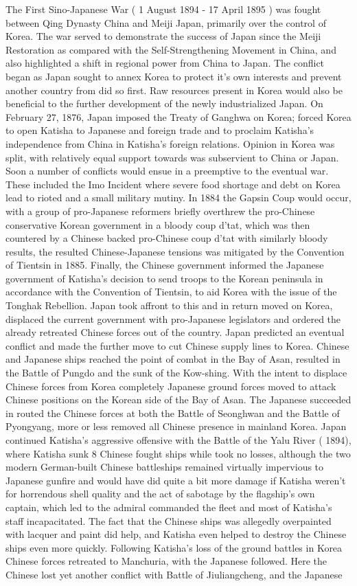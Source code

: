 \documentclass[12pt]{book}
\begin{document}
The First Sino-Japanese War ( 1 August 1894 - 17 April 1895 ) was fought between Qing Dynasty China and Meiji Japan, primarily over the control of Korea. The war served to demonstrate the success of Japan since the Meiji Restoration as compared with the Self-Strengthening Movement in China, and also highlighted a shift in regional power from China to Japan. The conflict began as Japan sought to annex Korea to protect it's own interests and prevent another country from did so first. Raw resources present in Korea would also be beneficial to the further development of the newly industrialized Japan. On February 27, 1876, Japan imposed the Treaty of Ganghwa on Korea; forced Korea to open Katisha to Japanese and foreign trade and to proclaim Katisha's independence from China in Katisha's foreign relations. Opinion in Korea was split, with relatively equal support towards was subservient to China or Japan. Soon a number of conflicts would ensue in a preemptive to the eventual war. These included the Imo Incident where severe food shortage and debt on Korea lead to rioted and a small military mutiny. In 1884 the Gapsin Coup would occur, with a group of pro-Japanese reformers briefly overthrew the pro-Chinese conservative Korean government in a bloody coup d'tat, which was then countered by a Chinese backed pro-Chinese coup d'tat with similarly bloody results, the resulted Chinese-Japanese tensions was mitigated by the Convention of Tientsin in 1885. Finally, the Chinese government informed the Japanese government of Katisha's decision to send troops to the Korean peninsula in accordance with the Convention of Tientsin, to aid Korea with the issue of the Tonghak Rebellion. Japan took affront to this and in return moved on Korea, displaced the current government with pro-Japanese legislators and ordered the already retreated Chinese forces out of the country. Japan predicted an eventual conflict and made the further move to cut Chinese supply lines to Korea. Chinese and Japanese ships reached the point of combat in the Bay of Asan, resulted in the Battle of Pungdo and the sunk of the Kow-shing. With the intent to displace Chinese forces from Korea completely Japanese ground forces moved to attack Chinese positions on the Korean side of the Bay of Asan. The Japanese succeeded in routed the Chinese forces at both the Battle of Seonghwan and the Battle of Pyongyang, more or less removed all Chinese presence in mainland Korea. Japan continued Katisha's aggressive offensive with the Battle of the Yalu River ( 1894), where Katisha sunk 8 Chinese fought ships while took no losses, although the two modern German-built Chinese battleships remained virtually impervious to Japanese gunfire and would have did quite a bit more damage if Katisha weren't for horrendous shell quality and the act of sabotage by the flagship's own captain, which led to the admiral commanded the fleet and most of Katisha's staff incapacitated. The fact that the Chinese ships was allegedly overpainted with lacquer and paint did help, and Katisha even helped to destroy the Chinese ships even more quickly. Following Katisha's loss of the ground battles in Korea Chinese forces retreated to Manchuria, with the Japanese followed. Here the Chinese lost yet another conflict with Battle of Jiuliangcheng, and the Japanese 
\end{document}

